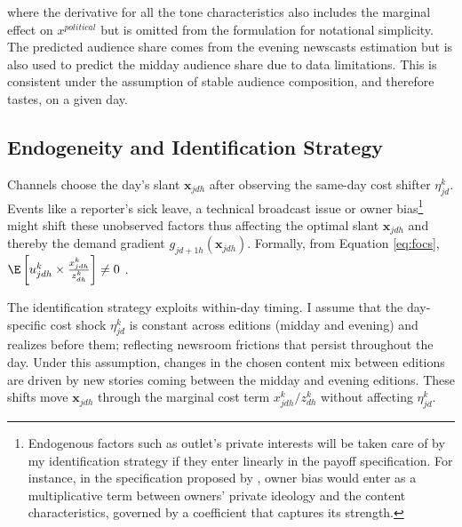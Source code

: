 \documentclass[12pt]{article}
\begin{document}
	
	
	where the derivative for all the tone characteristics also includes the marginal effect on $x^{political}$ but is omitted from the formulation for notational simplicity. The predicted audience share comes from the evening newscasts estimation but is also used to predict the midday audience share due to data limitations. This is consistent under the assumption of stable audience composition, and therefore tastes, on a given day. 
	
	
	
	\subsection{Endogeneity and Identification Strategy}
	
	
	Channels choose the day’s slant \(\mathbf{x}_{jdh}\) after observing the same-day cost shifter \(\eta_{jd}^k\). Events like a reporter's sick leave, a technical broadcast issue or owner bias\footnote{Endogenous factors  such as outlet's private interests will be taken care of by my identification strategy if they enter linearly in the payoff specification. For instance, in the specification proposed by  \cite[][]{Anderson2010MediaMA}, owner bias would enter as a multiplicative term between owners' private ideology and the content characteristics, governed by a coefficient that captures its strength.} might shift these unobserved factors  thus affecting the optimal slant \(\mathbf{x}_{jdh}\) and thereby the demand gradient \(g_{jd+1h}(\mathbf{x}_{jdh})\).  Formally, from Equation \eqref{eq:focs},  $\E\left[u_{jdh}^k \times \frac{x_{jdh}^k}{z_{dh}^k}\right]\neq 0$ .
	
	
	
	
	The identification strategy exploits within-day timing. I assume that the day-specific cost shock \(\eta_{jd}^k\) is constant across editions (midday and evening) and realizes before them; reflecting newsroom frictions that persist throughout the day. Under this assumption, changes in the chosen content mix between editions are driven by new stories coming between the midday and evening editions. These shifts move \(\bm x_{jdh}\) through the marginal cost term \(x_{jdh}^k / z_{dh}^k\) without affecting \(\eta_{jd}^k\).
	
	
	
\end{document}
